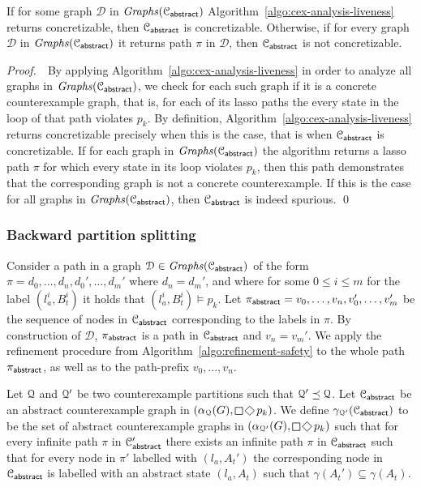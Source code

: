 \bigskip 

\begin{thm}
If for some graph $\mathcal{D}$ in $\mathit{Graphs}(\mathcal{C}_{\mathsf{abstract}})$  Algorithm~\ref{algo:cex-analysis-liveness} returns {\sc concretizable}, then $\mathcal{C}_{\mathsf{abstract}}$ is concretizable. Otherwise, if for every graph $\mathcal D$ in $\mathit{Graphs}(\mathcal{C}_{\mathsf{abstract}})$ it returns path $\pi$ in $\mathcal D$, then $\mathcal{C}_{\mathsf{abstract}}$ is not concretizable.
\end{thm}
{\it Proof.}\ \ 
By applying Algorithm~\ref{algo:cex-analysis-liveness} in order to analyze all graphs in $\mathit{Graphs}(\mathcal{C}_{\mathsf{abstract}})$, we check for each such graph if it is a concrete counterexample graph, that is, for each of its lasso paths the every state in the loop of that path violates $p_k$. By definition, Algorithm~\ref{algo:cex-analysis-liveness} returns {\sc concretizable} precisely when this is the case, that is when $\mathcal{C}_{\mathsf{abstract}}$ is concretizable. If for each graph in $\mathit{Graphs}(\mathcal{C}_{\mathsf{abstract}})$ the algorithm returns a lasso path $\pi$ for which every state in its loop violates $p_k$, then this path demonstrates that the corresponding graph is not a concrete counterexample. If this is the case for all graphs in $\mathit{Graphs}(\mathcal{C}_{\mathsf{abstract}})$, then $\mathcal{C}_{\mathsf{abstract}}$ is indeed spurious.
\qed

\bigskip 

\subsubsection{Backward partition splitting}

Consider a path in a graph $\mathcal{D}\in\mathit{Graphs}(\mathcal{C}_{\mathsf{abstract}})$ of the form $\pi = d_0,\ldots, d_n,d_0',\ldots,d_m'$ where $d_n = d_m'$, and where for some $0 \leq i \leq m$ for the label $(l_a^i,B_t^i)$ it holds that $(l_a^i,B_t^i) \models p_k$. Let 
$\pi_{\mathsf{abstract}} = v_0,\ldots, v_n,v_0',\ldots,v_m'$ be the sequence of nodes in $\mathcal{C}_{\mathsf{abstract}}$ corresponding to the labels in $\pi$. By construction of $\mathcal D$, $\pi_{\mathsf{abstract}}$ is a path in $\mathcal{C}_{\mathsf{abstract}}$ and $v_n = v_m'$. We apply the refinement procedure from Algorithm~\ref{algo:refinement-safety} to the whole path $\pi_{\mathsf{abstract}}$, as well as to the path-prefix $v_0,\ldots, v_n$.


Let $\mathcal{Q}$ and $\mathcal{Q}'$ be two counterexample partitions such that $\mathcal{Q}' \preceq \mathcal{Q}$. Let $\mathcal{C}_{\mathsf{abstract}}$ be an abstract counterexample graph in $(\alpha_\partition(G),\LTLglobally\LTLfinally p_k)$. We define $\gamma_{\mathcal{Q}'}(\mathcal{C}_{\mathsf{abstract}})$ to be the set of abstract counterexample graphs in $(\alpha_{\partition'}(G),\LTLglobally\LTLfinally p_k)$ such that for every infinite path $\pi$ in $\mathcal{C}_{\mathsf{abstract}}'$ there exists an infinite path $\pi$ in $\mathcal{C}_{\mathsf{abstract}}$ such that for every node in $\pi'$ labelled with $(l_a,A_t')$ the corresponding node in $\mathcal{C}_{\mathsf{abstract}}$ is labelled with an abstract state $(l_a,A_t)$ such that $\gamma(A_t') \subseteq \gamma(A_t)$.

